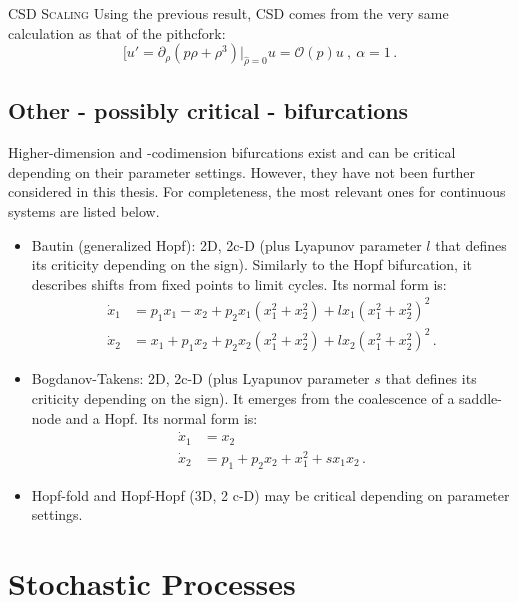 \textsc{CSD Scaling}
Using the previous result, CSD comes from the very same calculation as that of the pithcfork:
\begin{equation}
	[u' = \partial_\rho(p\rho+\rho^3)|_{\hat{\rho} = 0}u = \mathcal{O}(p) u \ , \ \alpha =1 \, .
\end{equation}




\tocless\subsection{Other - possibly critical - bifurcations}
Higher-dimension and -codimension bifurcations exist and can be critical depending on their parameter settings. However, they have not been further considered in this thesis. For completeness, the most relevant ones for continuous systems \citep{kuehn2011mathematical} are listed below.
\begin{itemize}
	\item 
	Bautin (generalized Hopf): 2D, 2c-D (plus Lyapunov parameter $l$ that defines its criticity depending on the sign). Similarly to the Hopf bifurcation, it describes shifts from fixed points to limit cycles. Its normal form is:
	\begin{align}
		\nonumber \dot{x}_1 &= p_1 x_1 - x_2 + p_2 x_1(x_1^2 + x_2^2) + l x_1 (x_1^2 + x_2^2)^2\\
		\dot{x}_2 &= x_1 + p_1 x_2 + p_2 x_2(x_1^2 + x_2^2) + l x_2 (x_1^2 + x_2^2)^2 \, .
		\label{eq:bautin}
	\end{align}
	\item 
	Bogdanov-Takens: 2D, 2c-D (plus Lyapunov parameter $s$ that defines its criticity depending on the sign). It emerges from the coalescence of a saddle-node and a Hopf. Its normal form is:
	\begin{align}
		\nonumber \dot{x}_1 &= x_2\\
		\dot{x}_2 &= p_1 + p_2 x_2 + x_1^2 + s x_1 x_2 \, .
		\label{eq:bog_tak}
	\end{align}
	\item 
	Hopf-fold and Hopf-Hopf (3D, 2 c-D) may be critical depending on parameter settings.
\end{itemize}








\tocless\section{Stochastic Processes}
\label{sec:stochastic_p_formal}

